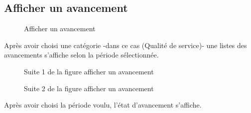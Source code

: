 \documentclass[a4paper]{report}
\begin{document}
\begin{doublespace}
\subsection{Afficher un avancement}
\begin{figure}[H]
	\begin{center}
		\caption{Afficher un avancement}
	\end{center}
\end{figure}
Après avoir choisi une catégorie -dans ce cas (Qualité de service)- une listes des avancements s'affiche selon la période sélectionnée.
\begin{figure}[H]
	\begin{center}
		\caption{Suite 1 de la figure afficher un avancement}
	\end{center}
\end{figure}
\begin{figure}[H]
	\begin{center}
		\caption{Suite 2 de la figure afficher un avancement}
	\end{center}
\end{figure}
Après avoir choisi la période voulu, l'état d'avancement s'affiche.

\end{doublespace}
\end{document}
